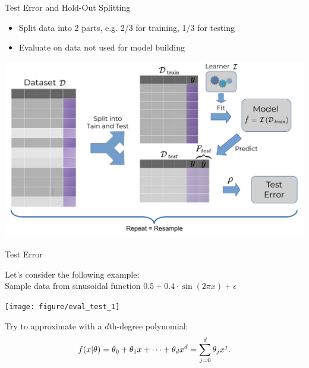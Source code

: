 \documentclass[11pt,compress,t,notes=noshow, xcolor=table]{beamer}
\newenvironment{knitrout}{}{} %
\begin{document}
\begin{vbframe}{Test Error and Hold-Out Splitting}
\begin{itemize}
  \item Split data into 2 parts, e.g. 2/3 for training, 1/3 for testing
  \item Evaluate on data not used for model building
\end{itemize}

\includegraphics[width=\textwidth]{figure_man/test_error.pdf}

\end{vbframe}

\begin{vbframe}{Test Error}

Let's consider the following example:\\
Sample data from sinusoidal function
$0.5 + 0.4 \cdot \sin (2 \pi x) + \epsilon$\\
\lz
\begin{knitrout}\scriptsize
{}\color{fgcolor}

{\centering \texttt{[image: figure/eval\_test\_1]} 

}



\end{knitrout}
Try to approximate with a $d$th-degree polynomial:
\[ f(x | \theta) = \theta_0 + \theta_1 x + \cdots + \theta_d x^d = \sum_{j = 0}^{d} \theta_j x^j\text{.} \]
\end{vbframe}
\end{document}
